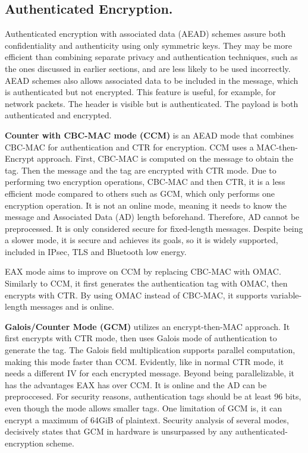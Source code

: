 \subsection{Authenticated Encryption.}  \label{chap:background:crypto:aead}

Authenticated encryption with associated data (AEAD) schemes assure both confidentiality and authenticity using only symmetric keys. They may be more efficient than combining separate privacy and authentication techniques, such as the ones discussed in earlier sections, and are less likely to be used incorrectly. AEAD schemes also allows associated data to be included in the message, which is authenticated but not encrypted. This feature is useful, for example, for network packets. The header is visible but is authenticated. The payload is both authenticated and encrypted. 

\textbf{Counter with CBC-MAC mode (CCM)} is an AEAD mode that combines CBC-MAC for authentication and CTR for encryption.
CCM uses a MAC-then-Encrypt approach. First, CBC-MAC is computed on the message to obtain the tag. Then the message and the tag are encrypted with CTR mode.
Due to performing two encryption operations, CBC-MAC and then CTR, it is a less efficient mode compared to others such as GCM, which only performs one encryption operation.
It is not an online mode, meaning it needs to know the message and Associated Data (AD) length beforehand. Therefore, AD cannot be preprocessed. It is only considered secure for fixed-length messages.
Despite being a slower mode, it is secure and achieves its goals, so it is widely supported, included in IPsec, TLS and Bluetooth low energy.

EAX mode aims to improve on CCM by replacing CBC-MAC with OMAC. Similarly to CCM, it first generates the authentication tag with OMAC, then encrypts with CTR.
By using OMAC instead of CBC-MAC, it supports variable-length messages and is online.

\textbf{Galois/Counter Mode (GCM)} utilizes an encrypt-then-MAC approach. It first encrypts with CTR mode, then uses Galois mode of authentication to generate the tag. The Galois field multiplication supports parallel computation, making this mode faster than CCM.
Evidently, like in normal CTR mode, it needs a different IV for each encrypted message.
Beyond being parallelizable, it has the advantages EAX has over CCM. It is online and the AD can be preproccesed.
For security reasons, authentication tags should be at least 96 bits, even though the mode allows smaller tags. One limitation of GCM is, it can encrypt a maximum of 64GiB of plaintext. Security analysis of several modes, decisively states that GCM in hardware is unsurpassed by any authenticated-encryption scheme.


